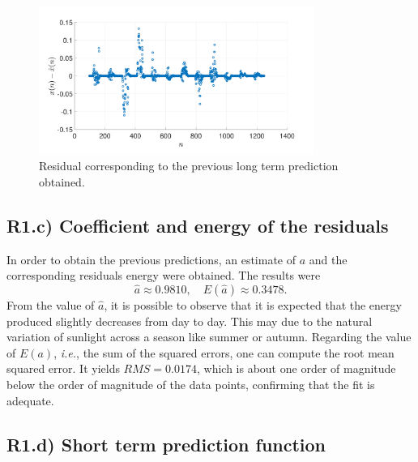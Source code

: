 \documentclass[a4paper, oneside, 11pt]{article}
\begin{document}
\begin{figure}[ht]
    \centering
    \includegraphics[width=0.8\textwidth]{figures/residuals.pdf}
    \caption{Residual corresponding to the previous long term prediction obtained.}
    \label{fig:R1b_r}
\end{figure}

\subsection{R1.c) Coefficient and energy of the residuals}

In order to obtain the previous predictions, an estimate of $a$ and the corresponding residuals energy were obtained. The results were
\begin{equation}
    \hat{a} \approx 0.9810, \quad E(\hat{a}) \approx 0.3478.
\end{equation}
From the value of $\hat{a}$, it is possible to observe that it is expected that the energy produced slightly decreases from day to day. This may due to the natural variation of sunlight across a season like summer or autumn. Regarding the value of $E(a)$, \textit{i.e.}, the sum of the squared errors, one can compute the root mean squared error. It yields $RMS = 0.0174$, which is about one order of magnitude below the order of magnitude of the data points, confirming that the fit is adequate.

\subsection{R1.d) Short term prediction function}
\end{document}
